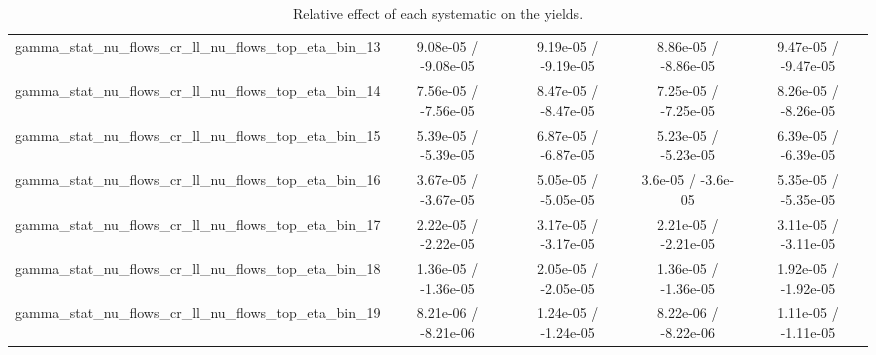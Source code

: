 \documentclass[10pt]{article}
\begin{document}
\begin{table}[htbp]
\begin{center}
\begin{tabular}{|c|c|c|c|c|}
  gamma_stat_nu_flows_cr_ll_nu_flows_top_eta_bin_13 & 9.08e-05 / -9.08e-05 & 9.19e-05 / -9.19e-05 & 8.86e-05 / -8.86e-05 & 9.47e-05 / -9.47e-05 \\ 
  gamma_stat_nu_flows_cr_ll_nu_flows_top_eta_bin_14 & 7.56e-05 / -7.56e-05 & 8.47e-05 / -8.47e-05 & 7.25e-05 / -7.25e-05 & 8.26e-05 / -8.26e-05 \\ 
  gamma_stat_nu_flows_cr_ll_nu_flows_top_eta_bin_15 & 5.39e-05 / -5.39e-05 & 6.87e-05 / -6.87e-05 & 5.23e-05 / -5.23e-05 & 6.39e-05 / -6.39e-05 \\ 
  gamma_stat_nu_flows_cr_ll_nu_flows_top_eta_bin_16 & 3.67e-05 / -3.67e-05 & 5.05e-05 / -5.05e-05 & 3.6e-05 / -3.6e-05 & 5.35e-05 / -5.35e-05 \\ 
  gamma_stat_nu_flows_cr_ll_nu_flows_top_eta_bin_17 & 2.22e-05 / -2.22e-05 & 3.17e-05 / -3.17e-05 & 2.21e-05 / -2.21e-05 & 3.11e-05 / -3.11e-05 \\ 
  gamma_stat_nu_flows_cr_ll_nu_flows_top_eta_bin_18 & 1.36e-05 / -1.36e-05 & 2.05e-05 / -2.05e-05 & 1.36e-05 / -1.36e-05 & 1.92e-05 / -1.92e-05 \\ 
  gamma_stat_nu_flows_cr_ll_nu_flows_top_eta_bin_19 & 8.21e-06 / -8.21e-06 & 1.24e-05 / -1.24e-05 & 8.22e-06 / -8.22e-06 & 1.11e-05 / -1.11e-05 \\ 
\hline 
\end{tabular} 
\caption{Relative effect of each systematic on the yields.} 
\end{center} 
\end{table} 
\end{document}
